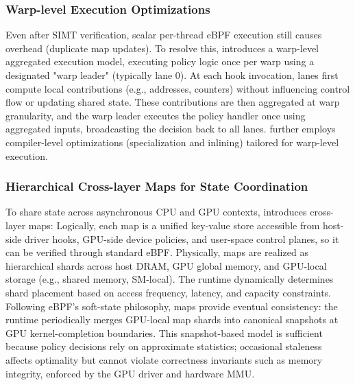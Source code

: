 \subsubsection{Warp-level Execution Optimizations}

Even after SIMT verification, scalar per-thread eBPF execution still causes overhead (\eg duplicate map updates). To resolve this, \sys introduces a warp-level aggregated execution model, executing policy logic once per warp using a designated "warp leader" (typically lane 0). At each hook invocation, lanes first compute local contributions (e.g., addresses, counters) without influencing control flow or updating shared state. These contributions are then aggregated at warp granularity, and the warp leader executes the policy handler once using aggregated inputs, broadcasting the decision back to all lanes. \sys further employs compiler-level optimizations (specialization and inlining) tailored for warp-level execution.

\subsubsection{Hierarchical Cross-layer Maps for State Coordination}
\label{sec:cross-layer-maps}

To share state across asynchronous CPU and GPU contexts, \sys introduces cross-layer maps: Logically, each map is a unified key-value store accessible from host-side driver hooks, GPU-side device policies, and user-space control planes, so it can be verified through standard eBPF. Physically, maps are realized as hierarchical shards across host DRAM, GPU global memory, and GPU-local storage (e.g., shared memory, SM-local). The runtime dynamically determines shard placement based on access frequency, latency, and capacity constraints. Following eBPF's soft-state philosophy, \sys maps provide eventual consistency: the runtime periodically merges GPU-local map shards into canonical snapshots at GPU kernel-completion boundaries. This snapshot-based model is sufficient because policy decisions rely on approximate statistics; occasional staleness affects optimality but cannot violate correctness invariants such as memory integrity, enforced by the GPU driver and hardware MMU.

